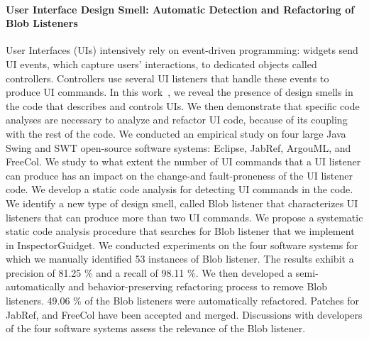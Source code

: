 \paragraph{User Interface Design Smell: Automatic Detection and Refactoring of Blob Listeners}

User Interfaces (UIs) intensively rely on event-driven programming: widgets send UI events, which capture users' interactions, to dedicated objects called controllers. Controllers use several UI listeners that handle these events to produce UI commands. In this work~\cite{blouin:hal-01499106}, we reveal the presence of design smells in the code that describes and controls UIs. We then demonstrate that specific code analyses are necessary to analyze and refactor UI code, because of its coupling with the rest of the code. We conducted an empirical study on four large Java Swing and SWT open-source software systems: Eclipse, JabRef, ArgouML, and FreeCol. We study to what extent the number of UI commands that a UI listener can produce has an impact on the change-and fault-proneness of the UI listener code. We develop a static code analysis for detecting UI commands in the code. We identify a new type of design smell, called Blob listener that characterizes UI listeners that can produce more than two UI commands. We propose a systematic static code analysis procedure that searches for Blob listener that we implement in InspectorGuidget. We conducted experiments on the four software systems for which we manually identified 53 instances of Blob listener. The results exhibit a precision of 81.25 \% and a recall of 98.11 \%. We then developed a semi-automatically and behavior-preserving refactoring process to remove Blob listeners. 49.06 \% of the Blob listeners were automatically refactored. Patches for JabRef, and FreeCol have been accepted and merged. Discussions with developers of the four software systems assess the relevance of the Blob listener.





